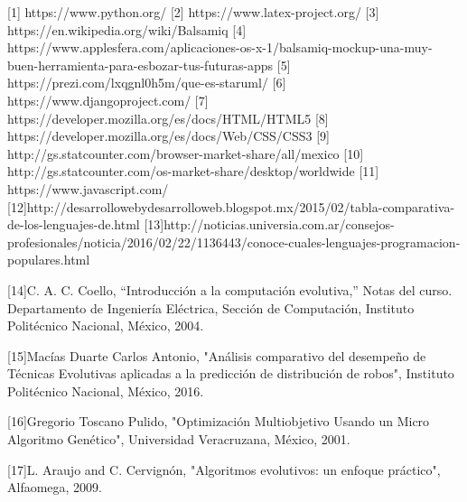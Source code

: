 \label{sec:bibliografia}

		[1] https://www.python.org/
	[2] https://www.latex-project.org/
	[3] https://en.wikipedia.org/wiki/Balsamiq 
	[4] https://www.applesfera.com/aplicaciones-os-x-1/balsamiq-mockup-una-muy-buen-herramienta-para-esbozar-tus-futuras-apps
	[5] https://prezi.com/lxqgnl0h5m/que-es-staruml/
	[6] https://www.djangoproject.com/
	[7] https://developer.mozilla.org/es/docs/HTML/HTML5
	[8] https://developer.mozilla.org/es/docs/Web/CSS/CSS3
	[9] http://gs.statcounter.com/browser-market-share/all/mexico
	[10] http://gs.statcounter.com/os-market-share/desktop/worldwide
	[11] https://www.javascript.com/
	[12]http://desarrollowebydesarrolloweb.blogspot.mx/2015/02/tabla-comparativa-de-los-lenguajes-de.html
	[13]http://noticias.universia.com.ar/consejos-profesionales/noticia/2016/02/22/1136443/conoce-cuales-lenguajes-programacion-populares.html
	
		[14]C. A. C. Coello, “Introducción a la computación evolutiva,” Notas del curso. Departamento de Ingeniería Eléctrica, Sección de Computación, Instituto Politécnico Nacional, México, 2004.

		[15]Macías Duarte Carlos Antonio, "Análisis comparativo del desempeño de Técnicas Evolutivas aplicadas a la predicción de distribución de robos", Instituto Politécnico Nacional, México, 2016.

		[16]Gregorio Toscano Pulido, "Optimización Multiobjetivo Usando un Micro Algoritmo Genético", Universidad Veracruzana, México, 2001.
		
		[17]L. Araujo and C. Cervignón, "Algoritmos evolutivos: un enfoque práctico", Alfaomega, 2009.
		
		